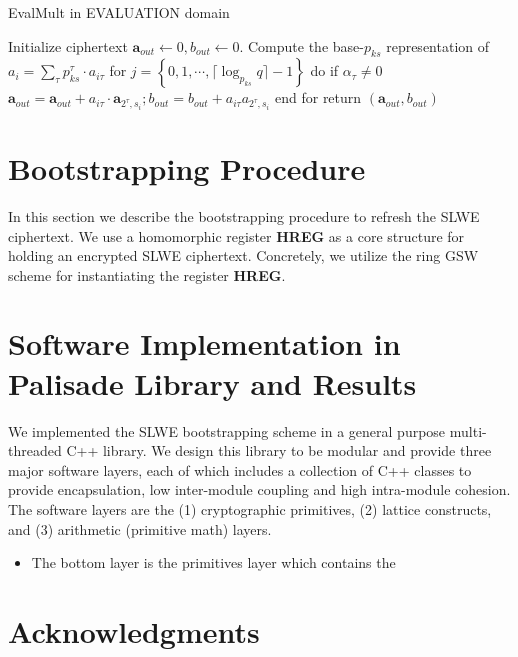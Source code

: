 \documentclass[10pt,journal,compsoc]{IEEEtran}
\theoremstyle{definition}
\begin{document}
\begin{algorithm}
\caption{EvalMult in EVALUATION domain}
\begin{algorithmic}[1]
\State Initialize ciphertext $\textbf{a}_{out}\leftarrow 0,b_{out}\leftarrow 0$.
\State Compute the base-$p_{ks}$ representation of $a_i = \sum_{\tau} p_{ks}^{\tau}\cdot a_{i\tau}$
\State for $j = \left\{ 0,1,\cdots,\lceil \log_{p_{ks}} q\rceil -1 \right\}$ do
\State \quad if $\alpha_\tau \neq 0$
\State \quad \quad $\textbf{a}_{out} = \textbf{a}_{out} + a_{i\tau}\cdot\textbf{a}_{2^{\tau},s_i}; b_{out} = b_{out} + a_{i\tau}a_{2^\tau,s_i}$
\State end for
\State return $\left(\textbf{a}_{out},b_{out}\right)$

\EndProcedure
\end{algorithmic}
\end{algorithm}
\section{Bootstrapping Procedure}

In this section we describe the bootstrapping procedure to refresh the SLWE ciphertext. We use a homomorphic register \textbf{HREG} as a core structure for holding an encrypted SLWE ciphertext. Concretely, we utilize the ring GSW scheme for instantiating the register \textbf{HREG}.

\section{Software Implementation in Palisade Library and Results}
We implemented the SLWE bootstrapping scheme in a general purpose multi-threaded C++ library. We design this library to be modular and provide three major software layers, each of which includes a collection of C++ classes to provide encapsulation, low inter-module coupling and high intra-module cohesion. The software layers are the (1) cryptographic primitives, (2) lattice constructs, and (3) arithmetic (primitive math) layers.

\begin{itemize}
\item The bottom layer is the primitives layer which contains the 
\end{itemize}
\appendices


\ifCLASSOPTIONcompsoc
  \section*{Acknowledgments}
\else
\end{document}
